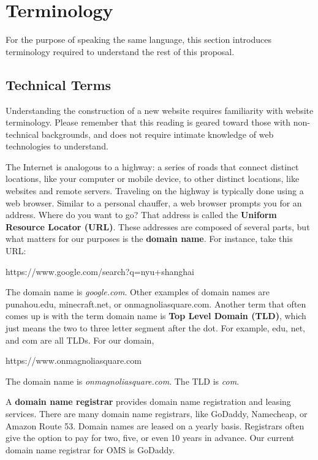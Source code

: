 \section{Terminology}
For the purpose of speaking the same language, this section introduces terminology required to understand the rest of this proposal.

\subsection{Technical Terms}
Understanding the construction of a new website requires familiarity with website terminology. Please remember that this reading is geared toward those with non-technical backgrounds, and does not require intimate knowledge of web technologies to understand.

The Internet is analogous to a highway: a series of roads that connect distinct locations, like your computer or mobile device, to other distinct locations, like websites and remote servers. Traveling on the highway is typically done using a web browser. Similar to a personal chauffer, a web browser prompts you for an address. Where do you want to go? That address is called the \textbf{Uniform Resource Locator (URL)}. These addresses are composed of several parts, but what matters for our purposes is the \textbf{domain name}. For instance, take this URL\@:

\begin{center}
    https://www.google.com/search?q=nyu+shanghai
\end{center}

The domain name is \textit{google.com}. Other examples of domain names are punahou.edu, minecraft.net, or onmagnoliasquare.com. Another term that often comes up is with the term domain name is \textbf{Top Level Domain (TLD)}, which just means the two to three letter segment after the dot. For example, edu, net, and com are all TLDs. For our domain,

\begin{center}
    https://www.onmagnoliasquare.com
\end{center}

The domain name is \textit{onmagnoliasquare.com}. The TLD is \textit{com}.

A \textbf{domain name registrar} provides domain name registration and leasing services. There are many domain name registrars, like GoDaddy, Namecheap, or Amazon Route 53. Domain names are leased on a yearly basis. Registrars often give the option to pay for two, five, or even 10 years in advance. Our current domain name registrar for OMS is GoDaddy.

